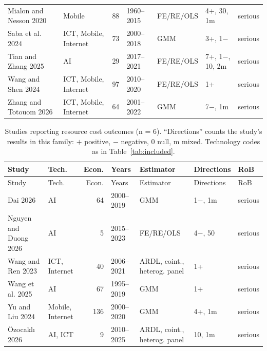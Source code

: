 {\begin{longtable}{@{}p{3.1cm} p{1.9cm} r l p{2.4cm} p{2.3cm} l@{}}
Mialon and Nesson 2020 & Mobile & 88 & 1960--2015 & FE/RE/OLS & 4+, 30, 1m & serious \\
Saba et al. 2024 & ICT, Mobile, Internet & 73 & 2000--2018 & GMM & 3+, 1$-$ & serious \\
Tian and Zhang 2025 & AI & 29 & 2017--2021 & FE/RE/OLS & 7+, 1$-$, 10, 2m & serious \\
Wang and Shen 2024 & ICT, Mobile, Internet & 97 & 2010--2020 & FE/RE/OLS & 1+ & serious \\
Zhang and Totouom 2026 & ICT, Mobile, Internet & 64 & 2001--2022 & GMM & 7$-$, 1m & serious \\
\end{longtable}
}

{\scriptsize\setlength{\tabcolsep}{3pt}
\begin{longtable}{@{}p{3.1cm} p{1.9cm} r l p{2.4cm} p{2.3cm} l@{}}
\caption{Studies reporting resource cost outcomes (n = 6). ``Directions'' counts the study's results in this family: $+$ positive, $-$ negative, 0 null, m mixed. Technology codes as in Table~\ref{tab:included}.}\label{tab:fam6}\\
\toprule Study & Tech. & Econ. & Years & Estimator & Directions & RoB \\ \midrule \endfirsthead
\toprule Study & Tech. & Econ. & Years & Estimator & Directions & RoB \\ \midrule \endhead
\bottomrule \endfoot
Dai 2026 & AI & 64 & 2000--2019 & GMM & 1$-$, 1m & serious \\
Nguyen and Duong 2026 & AI & 5 & 2015--2023 & FE/RE/OLS & 4$-$, 50 & serious \\
Wang and Ren 2023 & ICT, Internet & 40 & 2006--2021 & ARDL, coint., heterog. panel & 1+ & serious \\
Wang et al. 2025 & AI & 67 & 1995--2019 & GMM & 1+ & serious \\
Yu and Liu 2024 & Mobile, Internet & 136 & 2000--2020 & GMM & 4+, 1m & serious \\
Özocaklı 2026 & AI, ICT & 9 & 2010--2025 & ARDL, coint., heterog. panel & 10, 1m & serious \\
\end{longtable}
}
